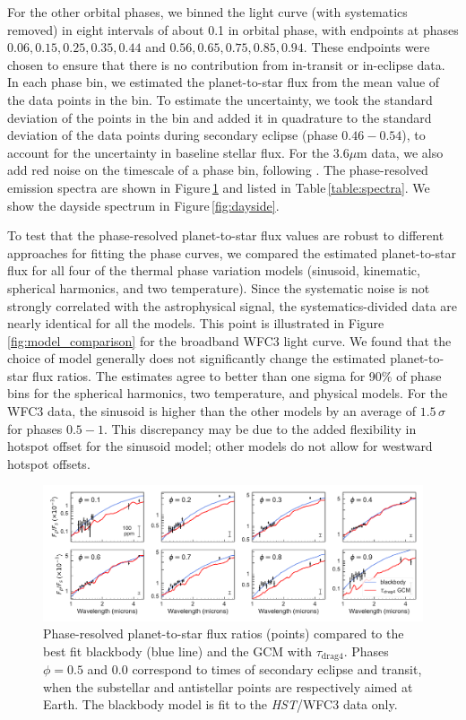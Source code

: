 \documentclass[twocolumn, trackchanges]{aastex61}
\newcommand{\project}[1]{\textsl{#1}}
\newcommand{\HST}{\project{HST}}
\begin{document}
For the other orbital phases, we binned the light curve (with systematics
removed) in eight intervals of about 0.1 in orbital phase, with endpoints at
phases $0.06, 0.15, 0.25, 0.35, 0.44$ and $0.56, 0.65, 0.75, 0.85, 0.94$. These
endpoints were chosen to ensure that there is no contribution from in-transit or
in-eclipse data.  In each phase bin, we estimated the planet-to-star flux from
the mean value of the data points in the bin. To estimate the uncertainty, we
took the standard deviation of the points in the bin and added it in quadrature
to the standard deviation of the data points during secondary eclipse (phase
$0.46-0.54$), to account for the uncertainty in baseline stellar flux.  For the
$3.6\mu$m data, we also add red noise on the timescale of a phase bin, following
\cite{pont06}.  The phase-resolved emission spectra are shown in
Figure\,\ref{fig:spectra} and listed in Table\,\ref{table:spectra}. We show the
dayside spectrum in Figure\,\ref{fig:dayside}.

To test that the phase-resolved planet-to-star flux values are robust to different approaches for fitting the phase curves, we compared the estimated planet-to-star flux for all four of the thermal phase variation models (sinusoid, kinematic, spherical harmonics, and two temperature).  Since the systematic noise is not strongly correlated with the astrophysical signal, the systematics-divided data are nearly identical for all the models.  This point is illustrated in Figure\,\ref{fig:model_comparison} for the broadband WFC3 light curve.  We found that the choice of model generally does not significantly change the estimated planet-to-star flux ratios.  The estimates agree to better than one sigma for 90\% of phase bins for the spherical harmonics, two temperature, and physical models. For the WFC3 data, the sinusoid is higher than the other models by an average of $1.5\,\sigma$ for phases $0.5 - 1$. This discrepancy may be due to the added flexibility in hotspot offset for the sinusoid model; other models do not allow for westward hotspot offsets.

\begin{figure}
\includegraphics[width = 1.0\textwidth]{fig6.pdf}
\caption{Phase-resolved planet-to-star flux ratios (points) compared to the best fit blackbody (blue line) and the GCM with $\tau_\mathrm{drag4}$. Phases $\phi=0.5$ and $0.0$ correspond to times of secondary eclipse and transit, when the substellar and antistellar points are respectively aimed at Earth. The blackbody model is fit to the \HST/WFC3 data only. }
\label{fig:spectra}
\end{figure}
\end{document}
